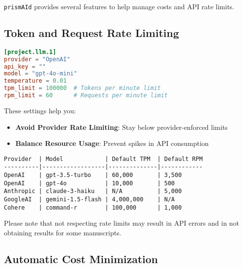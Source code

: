 \texttt{prismAId} provides several features to help manage costs and API rate limits.

\subsection{Token and Request Rate Limiting}

\begin{configbox}
\begin{lstlisting}[language=TOML]
[project.llm.1]
provider = "OpenAI"
api_key = ""
model = "gpt-4o-mini"
temperature = 0.01
tpm_limit = 100000  # Tokens per minute limit
rpm_limit = 60      # Requests per minute limit
\end{lstlisting}
\end{configbox}

These settings help you:
\begin{itemize}
    \item \textbf{Avoid Provider Rate Limiting}: Stay below provider-enforced limits
    \item \textbf{Balance Resource Usage}: Prevent spikes in API consumption
\end{itemize}

\begin{infobox}
\begin{lstlisting}
Provider  | Model            | Default TPM  | Default RPM
----------|------------------|--------------|------------
OpenAI    | gpt-3.5-turbo    | 60,000       | 3,500
OpenAI    | gpt-4o           | 10,000       | 500
Anthropic | claude-3-haiku   | N/A          | 5,000
GoogleAI  | gemini-1.5-flash | 4,000,000    | N/A
Cohere    | command-r        | 100,000      | 1,000
\end{lstlisting}
\end{infobox}

Please note that not respecting rate limits may result in API errors and in not obtaining results for some manuscripts.

\subsection{Automatic Cost Minimization}

